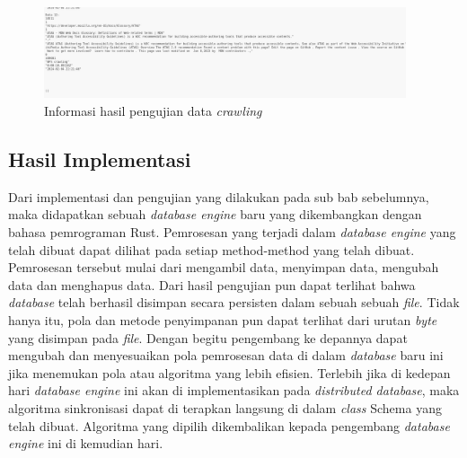 \begin{figure}[H]
	\centering{}
	\includegraphics[width=0.95\textwidth]{gambar/bab4/hasil-pengujian-data-hasil-crawling.png}
	\caption{Informasi hasil pengujian data \emph{crawling}}
\end{figure}


\subsection{Hasil Implementasi}

Dari implementasi dan pengujian yang dilakukan pada sub bab sebelumnya, maka didapatkan sebuah \emph{database engine} baru yang dikembangkan dengan bahasa pemrograman Rust.
Pemrosesan yang terjadi dalam \emph{database engine} yang telah dibuat dapat dilihat pada setiap method-method yang telah dibuat. Pemrosesan tersebut mulai dari mengambil data,
menyimpan data, mengubah data dan menghapus data. Dari hasil pengujian pun dapat terlihat bahwa \emph{database} telah berhasil disimpan secara persisten dalam sebuah sebuah \emph{file}.
Tidak hanya itu, pola dan metode penyimpanan pun dapat terlihat dari urutan \emph{byte} yang disimpan pada \emph{file}. Dengan begitu pengembang ke depannya dapat mengubah dan menyesuaikan pola
pemrosesan data di dalam \emph{database} baru ini jika menemukan pola atau algoritma yang lebih efisien. Terlebih jika di kedepan hari \emph{database engine} ini akan di implementasikan pada 
\emph{distributed database}, maka algoritma sinkronisasi dapat di terapkan langsung di dalam \emph{class} Schema yang telah dibuat. Algoritma yang dipilih dikembalikan kepada pengembang \emph{database
engine} ini di kemudian hari.

